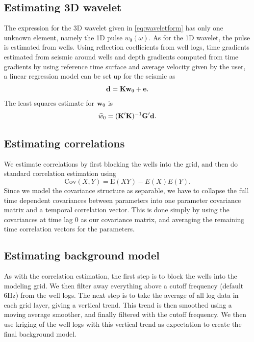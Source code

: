 \subsection{Estimating 3D wavelet}
\label{sec:3Dwaveestimp}
The expression for the 3D wavelet given in \autoref{eq:waveletform} has only one unknown element, namely the 1D pulse $w_0(\omega)$. As for the 1D wavelet, the pulse is estimated from wells. Using reflection coefficients from well logs, time gradients estimated from seismic around wells and depth gradients computed from time gradients by using reference time surface and average velocity given by the user, a linear regression model can be set up for the seismic as
\begin{equation}
\mathbf{d} = \mathbf{K}\mathbf{w}_0 + \mathbf{e}.
\end{equation}
The least squares estimate for $\mathbf{w}_0$ is
\begin{equation}
\widehat{w}_0 = (\mathbf{K}'\mathbf{K})^{-1}\mathbf{G}'\mathbf{d}.
\end{equation}

\subsection{Estimating correlations}
\label{sec:correstimp}
We estimate correlations by first blocking the wells into the grid, and then do standard correlation estimation using
\begin{equation}
\text{Cov}(X,Y) = \text{E}(XY)-E(X)E(Y).
\end{equation}
Since we model the covariance structure as separable, we have to collapse the full time dependent covariances between parameters into one parameter covariance matrix and a temporal correlation vector. This is done simply by using the covariances at time lag 0 as our covariance matrix, and averaging the remaining time correlation vectors for the parameters.

\subsection{Estimating background model}
As with the correlation estimation, the first step is to block the wells into the modeling grid. We then filter away everything above a cutoff frequency (default 6Hz) from the well logs. The next step is to take the average of all log data in each grid layer, giving a vertical trend. This trend is then smoothed using a moving average smoother, and finally filtered with the cutoff frequency. We then use kriging of the well logs with this vertical trend as expectation to create the final background model.

